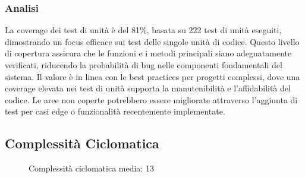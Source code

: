 \documentclass[a4paper,11pt,oneside]{scrartcl}
\begin{document}
\subsubsection*{Analisi}

La coverage dei test di unità è del 81\%, basata su 222 test di unità eseguiti, dimostrando un focus efficace sui test delle singole unità di codice. Questo livello di copertura assicura che le funzioni e i metodi principali siano adeguatamente verificati, riducendo la probabilità di bug nelle componenti fondamentali del sistema. Il valore è in linea con le best practices per progetti complessi, dove una coverage elevata nei test di unità supporta la manutenibilità e l'affidabilità del codice. Le aree non coperte potrebbero essere migliorate attraverso l'aggiunta di test per casi edge o funzionalità recentemente implementate.

\subsection{Complessità Ciclomatica}

\begin{figure}[H]
    \centering
    \caption{Complessità ciclomatica media: 13}
    \label{fig:complessita_ciclomatica}
\end{figure}
\end{document}
